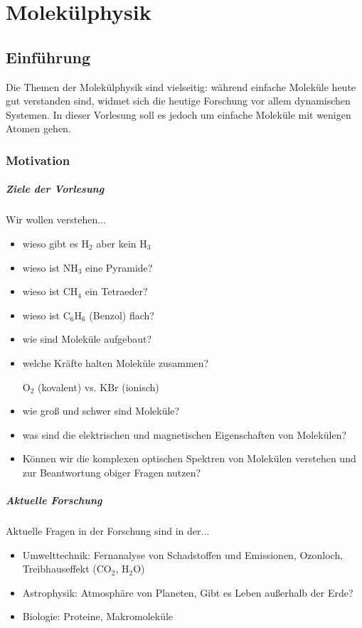 \chapter{Molekülphysik}
\label{chap:molekuelphysik}
\clearpage
\section{Einführung}

\begin{verbal}
    Die Themen der Molekülphysik sind vielseitig: während einfache Moleküle heute gut verstanden sind, widmet sich die heutige Forschung vor allem dynamischen Systemen. In dieser Vorlesung soll es jedoch um einfache Moleküle mit wenigen Atomen gehen.
\end{verbal}
    \subsection{Motivation}
    \paragraph{Ziele der Vorlesung} Wir wollen verstehen...
    \begin{itemize}
    	\item wieso gibt es $\text{H}_{2}$ aber kein $\text{H}_{3}$ 
    	\item wieso ist $\text{NH}_{3}$ eine Pyramide?
    	\item wieso ist $\text{CH}_{4}$ ein Tetraeder?
    	\item wieso ist $\text{C}_{6} \text{H}_{6}$ (Benzol) flach?
    	\item wie sind Moleküle aufgebaut?
    	\item welche Kräfte halten Moleküle zusammen?
    		\begin{center}
    			$\text{O}_{2}$ (kovalent) vs. $\text{KBr}$ (ionisch)
    		\end{center}
    	\item wie groß und schwer sind Moleküle?
    	\item was sind die elektrischen und magnetischen Eigenschaften von Molekülen?
    	\item Können wir die komplexen optischen Spektren von Molekülen verstehen und zur Beantwortung obiger Fragen nutzen?
    \end{itemize}
    \paragraph{Aktuelle Forschung} Aktuelle Fragen in der Forschung sind in der...
    \begin{itemize}
    	\item Umwelttechnik: Fernanalyse von Schadstoffen und Emissionen, Ozonloch, Treibhauseffekt ($\text{CO}_{2}$, $\text{H}_{2}\text{O}$)
    	\item Astrophysik: Atmosphäre von Planeten, Gibt es Leben außerhalb der Erde?
    	\item Biologie: Proteine, Makromoleküle
    \end{itemize}
    
